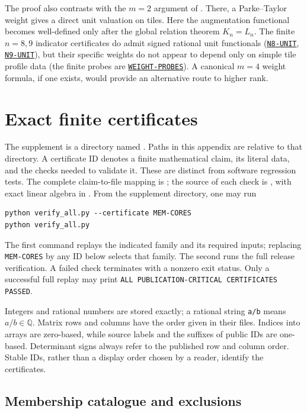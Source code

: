 \documentclass[11pt]{article}
\newcommand{\1}{\mathbf 1}
\newcommand{\cert}[1]{\hyperref[cert:#1]{\texttt{#1}}}
\begin{document}
The proof also contrasts with the $m=2$ argument of
\cite{M2Magic}.  There, a Parke--Taylor weight gives a direct unit valuation
on tiles.  Here the augmentation functional becomes well-defined only
after the global relation theorem $K_n=L_n$.  The finite $n=8,9$ indicator
certificates do admit signed rational unit functionals
(\cert{N8-UNIT}, \cert{N9-UNIT}), but their specific
weights do not appear to depend only on simple tile profile data
(the finite probes are \cert{WEIGHT-PROBES}).  A
canonical $m=4$ weight formula, if one exists, would provide an alternative
route to higher rank.

\appendix

\section{Exact finite certificates}\label{app:certificates}

The supplement is a directory named .  Paths in this
appendix are relative to that directory.  A certificate ID denotes a
finite mathematical claim, its literal data, and the checks needed to
validate it.  These are distinct from software regression tests.  The
complete claim-to-file mapping is ; the source
of each check is , with exact linear algebra in
.  From the supplement directory, one may run
\begin{verbatim}
python verify_all.py --certificate MEM-CORES
python verify_all.py
\end{verbatim}
The first command replays the indicated family and its required inputs;
replacing \texttt{MEM-CORES} by any ID below selects that family.  The
second runs the full release verification.  A failed check terminates
with a nonzero exit status.  Only a successful full replay may print
\texttt{ALL PUBLICATION-CRITICAL CERTIFICATES PASSED}.

Integers and rational numbers are stored exactly; a rational string
\texttt{a/b} means $a/b\in\mathbb Q$.  Matrix rows and columns have the
order given in their files.  Indices into arrays are zero-based, while
source labels and the suffixes of public IDs are one-based.  Determinant
signs always refer to the published row and column order.  Stable IDs,
rather than a display order chosen by a reader, identify the certificates.

\subsection{Membership catalogue and exclusions}
\label{cert:MEM-CORES}\label{cert:MEM-FOUR-MASS}\label{cert:MEM-SPURION}
\end{document}
